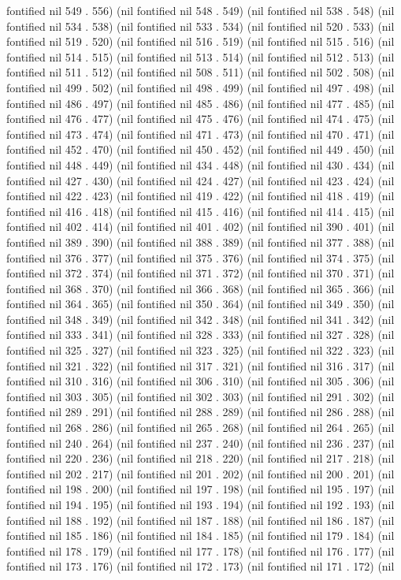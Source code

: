 fontified nil 549 . 556) (nil fontified nil 548 . 549) (nil fontified nil 538 . 548) (nil fontified nil 534 . 538) (nil fontified nil 533 . 534) (nil fontified nil 520 . 533) (nil fontified nil 519 . 520) (nil fontified nil 516 . 519) (nil fontified nil 515 . 516) (nil fontified nil 514 . 515) (nil fontified nil 513 . 514) (nil fontified nil 512 . 513) (nil fontified nil 511 . 512) (nil fontified nil 508 . 511) (nil fontified nil 502 . 508) (nil fontified nil 499 . 502) (nil fontified nil 498 . 499) (nil fontified nil 497 . 498) (nil fontified nil 486 . 497) (nil fontified nil 485 . 486) (nil fontified nil 477 . 485) (nil fontified nil 476 . 477) (nil fontified nil 475 . 476) (nil fontified nil 474 . 475) (nil fontified nil 473 . 474) (nil fontified nil 471 . 473) (nil fontified nil 470 . 471) (nil fontified nil 452 . 470) (nil fontified nil 450 . 452) (nil fontified nil 449 . 450) (nil fontified nil 448 . 449) (nil fontified nil 434 . 448) (nil fontified nil 430 . 434) (nil fontified nil 427 . 430) (nil fontified nil 424 . 427) (nil fontified nil 423 . 424) (nil fontified nil 422 . 423) (nil fontified nil 419 . 422) (nil fontified nil 418 . 419) (nil fontified nil 416 . 418) (nil fontified nil 415 . 416) (nil fontified nil 414 . 415) (nil fontified nil 402 . 414) (nil fontified nil 401 . 402) (nil fontified nil 390 . 401) (nil fontified nil 389 . 390) (nil fontified nil 388 . 389) (nil fontified nil 377 . 388) (nil fontified nil 376 . 377) (nil fontified nil 375 . 376) (nil fontified nil 374 . 375) (nil fontified nil 372 . 374) (nil fontified nil 371 . 372) (nil fontified nil 370 . 371) (nil fontified nil 368 . 370) (nil fontified nil 366 . 368) (nil fontified nil 365 . 366) (nil fontified nil 364 . 365) (nil fontified nil 350 . 364) (nil fontified nil 349 . 350) (nil fontified nil 348 . 349) (nil fontified nil 342 . 348) (nil fontified nil 341 . 342) (nil fontified nil 333 . 341) (nil fontified nil 328 . 333) (nil fontified nil 327 . 328) (nil fontified nil 325 . 327) (nil fontified nil 323 . 325) (nil fontified nil 322 . 323) (nil fontified nil 321 . 322) (nil fontified nil 317 . 321) (nil fontified nil 316 . 317) (nil fontified nil 310 . 316) (nil fontified nil 306 . 310) (nil fontified nil 305 . 306) (nil fontified nil 303 . 305) (nil fontified nil 302 . 303) (nil fontified nil 291 . 302) (nil fontified nil 289 . 291) (nil fontified nil 288 . 289) (nil fontified nil 286 . 288) (nil fontified nil 268 . 286) (nil fontified nil 265 . 268) (nil fontified nil 264 . 265) (nil fontified nil 240 . 264) (nil fontified nil 237 . 240) (nil fontified nil 236 . 237) (nil fontified nil 220 . 236) (nil fontified nil 218 . 220) (nil fontified nil 217 . 218) (nil fontified nil 202 . 217) (nil fontified nil 201 . 202) (nil fontified nil 200 . 201) (nil fontified nil 198 . 200) (nil fontified nil 197 . 198) (nil fontified nil 195 . 197) (nil fontified nil 194 . 195) (nil fontified nil 193 . 194) (nil fontified nil 192 . 193) (nil fontified nil 188 . 192) (nil fontified nil 187 . 188) (nil fontified nil 186 . 187) (nil fontified nil 185 . 186) (nil fontified nil 184 . 185) (nil fontified nil 179 . 184) (nil fontified nil 178 . 179) (nil fontified nil 177 . 178) (nil fontified nil 176 . 177) (nil fontified nil 173 . 176) (nil fontified nil 172 . 173) (nil fontified nil 171 . 172) (nil 
